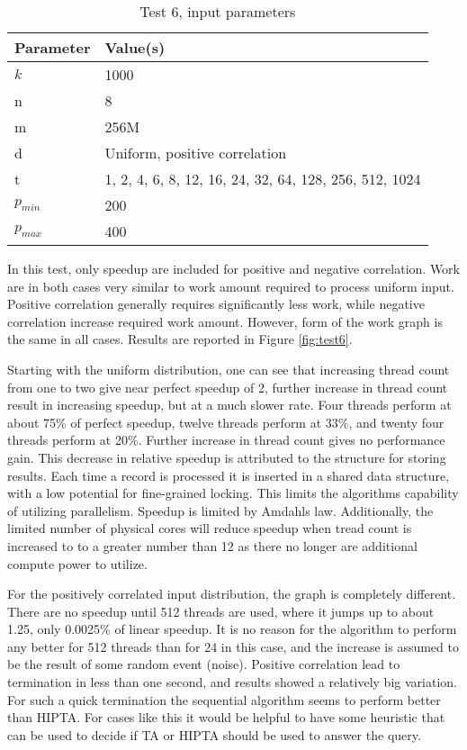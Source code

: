 \begin{table}[H]
	\centering
	\begin{tabular}{|l|l|}
	\hline
	Parameter & Value(s) \\ \hline
	$k$ & 1000 \\
	n & 8\\
	m & 256M\\
	d & Uniform, positive correlation\\
	t & 1, 2, 4, 6, 8, 12, 16, 24, 32, 64, 128, 256, 512, 1024\\
	$p_{min}$ & 200\\
	$p_{max}$ & 400\\
	\hline
	\end{tabular}
	\caption{Test 6, input parameters}
	\label{tab:test2-params}
\end{table}

In this test, only speedup are included for positive and negative
correlation. Work are in both cases very similar to work amount
required to process uniform input. Positive correlation generally
requires significantly less work, while negative correlation increase
required work amount. However, form of the work graph is the same in
all cases. Results are reported in Figure \ref{fig:test6}.

Starting with the uniform distribution, one can see that increasing
thread count from one to two give near perfect speedup of 2, further
increase in thread count result in increasing speedup, but at a much
slower rate. Four threads perform at about 75\% of perfect speedup,
twelve threads perform at 33\%, and twenty four threads perform at
20\%.  Further increase in thread count gives no performance gain.
This decrease in relative speedup is attributed to the structure for
storing results. Each time a record is processed it is inserted in a
shared data structure, with a low potential for fine-grained locking.
This limits the algorithms capability of utilizing parallelism.
Speedup is limited by Amdahls law. Additionally, the limited number of
physical cores will reduce speedup when tread count is increased to to
a greater number than 12 as there no longer are additional compute
power to utilize.  

For the positively correlated input distribution, the graph is
completely different. There are no speedup until 512 threads are used,
where it jumps up to about 1.25, only 0.0025\% of linear speedup. It
is no reason for the algorithm to perform any better for 512 threads
than for 24 in this case, and the increase is assumed to be the result
of some random event (noise). Positive correlation lead to termination
in less than one second, and results showed a relatively big
variation. For such a quick termination the sequential algorithm seems
to perform better than HIPTA. For cases like this it would be helpful
to have some heuristic that can be used to decide if TA or HIPTA
should be used to answer the query.


